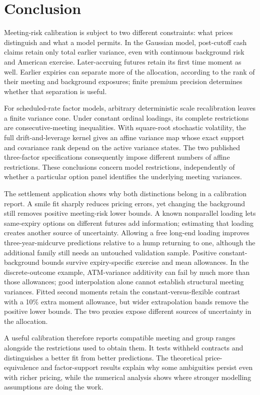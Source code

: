 \section{Conclusion}
Meeting-risk calibration is subject to two different constraints: what prices distinguish and what a model permits. In the Gaussian model, post-cutoff cash claims retain only total earlier variance, even with continuous background risk and American exercise. Later-accruing futures retain its first time moment as well. Earlier expiries can separate more of the allocation, according to the rank of their meeting and background exposures; finite premium precision determines whether that separation is useful.

For scheduled-rate factor models, arbitrary deterministic scale recalibration leaves a finite variance cone. Under constant ordinal loadings, its complete restrictions are consecutive-meeting inequalities. With square-root stochastic volatility, the full drift-and-leverage kernel gives an affine variance map whose exact support and covariance rank depend on the active variance states. The two published three-factor specifications consequently impose different numbers of affine restrictions. These conclusions concern model restrictions, independently of whether a particular option panel identifies the underlying meeting variances.

The settlement application shows why both distinctions belong in a calibration report. A smile fit sharply reduces pricing errors, yet changing the background still removes positive meeting-risk lower bounds. A known nonparallel loading lets same-expiry options on different futures add information; estimating that loading creates another source of uncertainty. Allowing a free long-end loading improves three-year-midcurve predictions relative to a hump returning to one, although the additional family still needs an untouched validation sample. Positive constant-background bounds survive expiry-specific exercise and mean allowances. In the discrete-outcome example, ATM-variance additivity can fail by much more than those allowances; good interpolation alone cannot establish structural meeting variances. Fitted second moments retain the constant-versus-flexible contrast with a 10\% extra moment allowance, but wider extrapolation bands remove the positive lower bounds. The two proxies expose different sources of uncertainty in the allocation.

A useful calibration therefore reports compatible meeting and group ranges alongside the restrictions used to obtain them. It tests withheld contracts and distinguishes a better fit from better predictions. The theoretical price-equivalence and factor-support results explain why some ambiguities persist even with richer pricing, while the numerical analysis shows where stronger modelling assumptions are doing the work.
